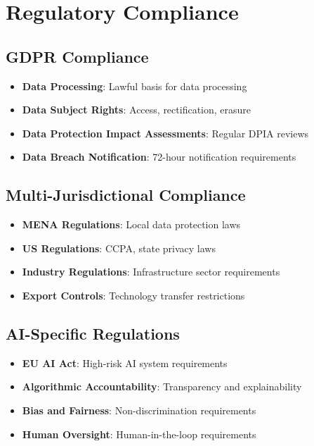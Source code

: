 \documentclass[business]{../templates/infraradar-main}
\begin{document}
\section{Regulatory Compliance}

\subsection{GDPR Compliance}
\begin{itemize}
    \item \textbf{Data Processing}: Lawful basis for data processing
    \item \textbf{Data Subject Rights}: Access, rectification, erasure
    \item \textbf{Data Protection Impact Assessments}: Regular DPIA reviews
    \item \textbf{Data Breach Notification}: 72-hour notification requirements
\end{itemize}

\subsection{Multi-Jurisdictional Compliance}
\begin{itemize}
    \item \textbf{MENA Regulations}: Local data protection laws
    \item \textbf{US Regulations}: CCPA, state privacy laws
    \item \textbf{Industry Regulations}: Infrastructure sector requirements
    \item \textbf{Export Controls}: Technology transfer restrictions
\end{itemize}

\subsection{AI-Specific Regulations}
\begin{itemize}
    \item \textbf{EU AI Act}: High-risk AI system requirements
    \item \textbf{Algorithmic Accountability}: Transparency and explainability
    \item \textbf{Bias and Fairness}: Non-discrimination requirements
    \item \textbf{Human Oversight}: Human-in-the-loop requirements
\end{itemize}
\end{document}
